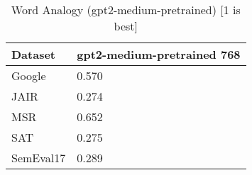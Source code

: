 \begin{table}[]
\centering
\begin{tabular}{l|l}
\hline
Dataset & gpt2-medium-pretrained 768 \\
\hline
Google & 0.570 \\ 
JAIR & 0.274 \\ 
MSR & 0.652 \\ 
SAT & 0.275 \\ 
SemEval17 & 0.289
\end{tabular}
\caption{Word Analogy (gpt2-medium-pretrained) [1 is best]}
\label{tab:analogy-gpt2-medium-pretrained}
\end{table}
